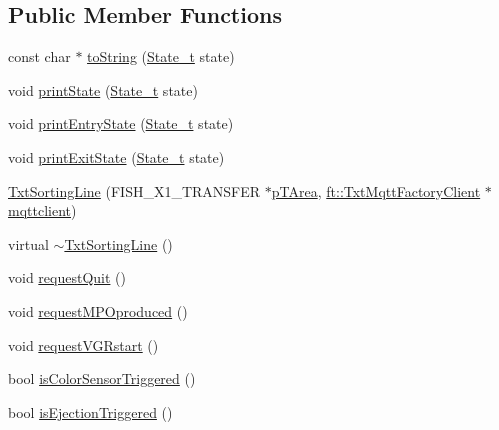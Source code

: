 \subsection*{Public Member Functions}
\begin{DoxyCompactItemize}
\item 
const char $\ast$ \hyperlink{classft_1_1_txt_sorting_line_aeb516ab5ebd693f764ce3da4b3eff36e}{to\+String} (\hyperlink{classft_1_1_txt_sorting_line_a02aa5385ab3fe32f2c3ca14a56e5ba57}{State\+\_\+t} state)
\item 
void \hyperlink{classft_1_1_txt_sorting_line_a06206894eb0c5223fc6be036c681296b}{print\+State} (\hyperlink{classft_1_1_txt_sorting_line_a02aa5385ab3fe32f2c3ca14a56e5ba57}{State\+\_\+t} state)
\item 
void \hyperlink{classft_1_1_txt_sorting_line_a74052159a3ca223d4ee0fe2ab7dc6874}{print\+Entry\+State} (\hyperlink{classft_1_1_txt_sorting_line_a02aa5385ab3fe32f2c3ca14a56e5ba57}{State\+\_\+t} state)
\item 
void \hyperlink{classft_1_1_txt_sorting_line_ab9152e584dfa35d82088f60a8e1fde7b}{print\+Exit\+State} (\hyperlink{classft_1_1_txt_sorting_line_a02aa5385ab3fe32f2c3ca14a56e5ba57}{State\+\_\+t} state)
\item 
\hyperlink{classft_1_1_txt_sorting_line_ab2ad605faac1ea873a82fdb65188ed7b}{Txt\+Sorting\+Line} (F\+I\+S\+H\+\_\+\+X1\+\_\+\+T\+R\+A\+N\+S\+F\+ER $\ast$\hyperlink{classft_1_1_txt_simulation_model_a9facd66a0dbecd676ae7b72c37a0b300}{p\+T\+Area}, \hyperlink{classft_1_1_txt_mqtt_factory_client}{ft\+::\+Txt\+Mqtt\+Factory\+Client} $\ast$\hyperlink{classft_1_1_txt_simulation_model_a6a92fdef8619b9b1636c7c464091ea3a}{mqttclient})
\item 
virtual \hyperlink{classft_1_1_txt_sorting_line_a1bb8b9629f9e37fdaa77b04346f12002}{$\sim$\+Txt\+Sorting\+Line} ()
\item 
void \hyperlink{classft_1_1_txt_sorting_line_a2eab8ce62928b0446a66ef09bd60bb3f}{request\+Quit} ()
\item 
void \hyperlink{classft_1_1_txt_sorting_line_a8afc658e32ab158b3f5718419c3265c1}{request\+M\+P\+Oproduced} ()
\item 
void \hyperlink{classft_1_1_txt_sorting_line_a1e009dcf115f08b49caff1d8a94b1eaa}{request\+V\+G\+Rstart} ()
\item 
bool \hyperlink{classft_1_1_txt_sorting_line_af89f5dfc5b6a7b3413d0fde89016bfcb}{is\+Color\+Sensor\+Triggered} ()
\item 
bool \hyperlink{classft_1_1_txt_sorting_line_aef178ffb1c268d9f98e98d08f48bf8b2}{is\+Ejection\+Triggered} ()

\end{DoxyCompactItemize}

